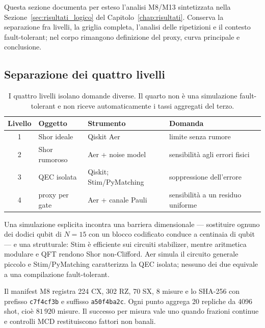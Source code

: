 \begin{onehalfspace}

Questa sezione documenta per esteso l'analisi M8/M13 sintetizzata nella
Sezione~\ref{sec:risultati_logico} del Capitolo~\ref{chap:risultati}.
Conserva la separazione fra livelli, la griglia completa, l'analisi delle
ripetizioni e il contesto fault-tolerant; nel corpo rimangono definizione
del proxy, curva principale e conclusione.

\subsection{Separazione dei quattro livelli}
\label{app:shor_quattro_livelli}

\begin{table}[H]
\centering
\footnotesize
\begin{tabular}{clll}
\toprule
\textbf{Livello} & \textbf{Oggetto} & \textbf{Strumento} & \textbf{Domanda} \\
\midrule
1 & Shor ideale & Qiskit Aer & limite senza rumore \\
2 & Shor rumoroso & Aer + noise model & sensibilità agli errori fisici \\
3 & QEC isolata & Qiskit; Stim/PyMatching & soppressione dell'errore \\
4 & proxy per gate & Aer + canale Pauli & sensibilità a un residuo uniforme \\
\bottomrule
\end{tabular}
\caption[Architettura a quattro livelli della parte sperimentale]{I
quattro livelli isolano domande diverse. Il quarto non è una simulazione
fault-tolerant e non riceve automaticamente i tassi aggregati del terzo.}
\label{tab:quattro_livelli}
\end{table}

Una simulazione esplicita incontra una barriera dimensionale --- sostituire
ognuno dei dodici qubit di $N=15$ con un blocco codificato conduce a
centinaia di qubit --- e una strutturale: Stim è efficiente sui circuiti
stabilizer, mentre aritmetica modulare e QFT rendono Shor non-Clifford.
Aer simula il circuito generale piccolo e Stim/PyMatching caratterizza la
QEC isolata; nessuno dei due equivale a una compilazione fault-tolerant.

Il manifest M8 registra 224 CX, 302 RZ, 70 SX, 8 misure e lo SHA-256 con
prefisso \texttt{c7f4cf3b} e suffisso \texttt{a50f4ba2c}. Ogni punto aggrega 20 repliche da
4096 shot, cioè $81\,920$ misure. Il successo per misura vale uno quando
frazioni continue e controlli MCD restituiscono fattori non banali.


\end{onehalfspace}
